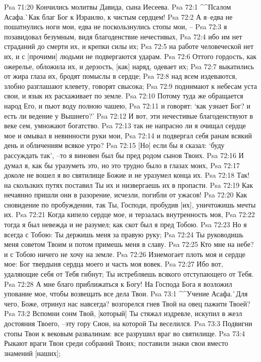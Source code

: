 Psa 71:20  Кончились молитвы Давида, сына Иесеева.
Psa 72:1  ^^Псалом Асафа.^^ Как благ Бог к Израилю, к чистым сердцем!
Psa 72:2  А я--едва не пошатнулись ноги мои, едва не поскользнулись стопы мои, --
Psa 72:3  я позавидовал безумным, видя благоденствие нечестивых,
Psa 72:4  ибо им нет страданий до смерти их, и крепки силы их;
Psa 72:5  на работе человеческой нет их, и с [прочими] людьми не подвергаются ударам.
Psa 72:6  Оттого гордость, как ожерелье, обложила их, и дерзость, [как] наряд, одевает их;
Psa 72:7  выкатились от жира глаза их, бродят помыслы в сердце;
Psa 72:8  над всем издеваются, злобно разглашают клевету, говорят свысока;
Psa 72:9  поднимают к небесам уста свои, и язык их расхаживает по земле.
Psa 72:10  Потому туда же обращается народ Его, и пьют воду полною чашею,
Psa 72:11  и говорят: `как узнает Бог? и есть ли ведение у Вышнего?'
Psa 72:12  И вот, эти нечестивые благоденствуют в веке сем, умножают богатство.
Psa 72:13  так не напрасно ли я очищал сердце мое и омывал в невинности руки мои,
Psa 72:14  и подвергал себя ранам всякий день и обличениям всякое утро?
Psa 72:15  [Но] если бы я сказал: `буду рассуждать так', --то я виновен был бы пред родом сынов Твоих.
Psa 72:16  И думал я, как бы уразуметь это, но это трудно было в глазах моих,
Psa 72:17  доколе не вошел я во святилище Божие и не уразумел конца их.
Psa 72:18  Так! на скользких путях поставил Ты их и низвергаешь их в пропасти.
Psa 72:19  Как нечаянно пришли они в разорение, исчезли, погибли от ужасов!
Psa 72:20  Как сновидение по пробуждении, так Ты, Господи, пробудив [их], уничтожишь мечты их.
Psa 72:21  Когда кипело сердце мое, и терзалась внутренность моя,
Psa 72:22  тогда я был невежда и не разумел; как скот был я пред Тобою.
Psa 72:23  Но я всегда с Тобою: Ты держишь меня за правую руку;
Psa 72:24  Ты руководишь меня советом Твоим и потом примешь меня в славу.
Psa 72:25  Кто мне на небе? и с Тобою ничего не хочу на земле.
Psa 72:26  Изнемогает плоть моя и сердце мое: Бог твердыня сердца моего и часть моя вовек.
Psa 72:27  Ибо вот, удаляющие себя от Тебя гибнут; Ты истребляешь всякого отступающего от Тебя.
Psa 72:28  А мне благо приближаться к Богу! На Господа Бога я возложил упование мое, чтобы возвещать все дела Твои.
Psa 73:1  ^^Учение Асафа.^^ Для чего, Боже, отринул нас навсегда? возгорелся гнев Твой на овец пажити Твоей?
Psa 73:2  Вспомни сонм Твой, [который] Ты стяжал издревле, искупил в жезл достояния Твоего, --эту гору Сион, на которой Ты веселился.
Psa 73:3  Подвигни стопы Твои к вековым развалинам: все разрушил враг во святилище.
Psa 73:4  Рыкают враги Твои среди собраний Твоих; поставили знаки свои вместо знамений [наших];
